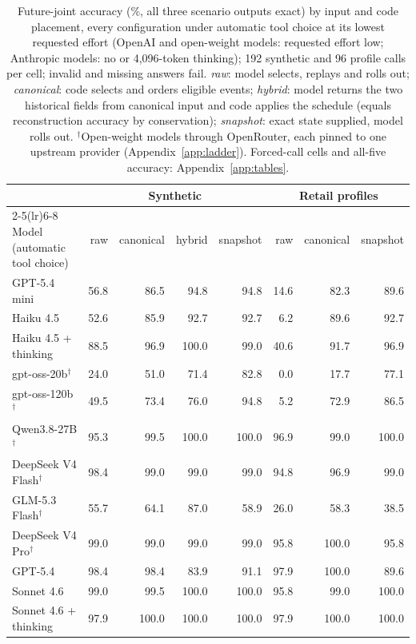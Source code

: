 \begin{table}[t]
\centering\footnotesize
\setlength{\tabcolsep}{3.5pt}
\begin{tabular}{lrrrrrrr}
\toprule
 & \multicolumn{4}{c}{Synthetic} & \multicolumn{3}{c}{Retail profiles} \\
\cmidrule(lr){2-5}\cmidrule(lr){6-8}
Model (automatic tool choice) & raw & canonical & hybrid & snapshot & raw & canonical & snapshot \\
\midrule
GPT-5.4 mini & 56.8 & 86.5 & 94.8 & 94.8 & 14.6 & 82.3 & 89.6 \\
Haiku 4.5 & 52.6 & 85.9 & 92.7 & 92.7 & 6.2 & 89.6 & 92.7 \\
Haiku 4.5 + thinking & 88.5 & 96.9 & 100.0 & 99.0 & 40.6 & 91.7 & 96.9 \\
gpt-oss-20b$^\dagger$ & 24.0 & 51.0 & 71.4 & 82.8 & 0.0 & 17.7 & 77.1 \\
gpt-oss-120b$^\dagger$ & 49.5 & 73.4 & 76.0 & 94.8 & 5.2 & 72.9 & 86.5 \\
Qwen3.8-27B$^\dagger$ & 95.3 & 99.5 & 100.0 & 100.0 & 96.9 & 99.0 & 100.0 \\
DeepSeek V4 Flash$^\dagger$ & 98.4 & 99.0 & 99.0 & 99.0 & 94.8 & 96.9 & 99.0 \\
GLM-5.3 Flash$^\dagger$ & 55.7 & 64.1 & 87.0 & 58.9 & 26.0 & 58.3 & 38.5 \\
DeepSeek V4 Pro$^\dagger$ & 99.0 & 99.0 & 99.0 & 99.0 & 95.8 & 100.0 & 95.8 \\
GPT-5.4 & 98.4 & 98.4 & 83.9 & 91.1 & 97.9 & 100.0 & 89.6 \\
Sonnet 4.6 & 99.0 & 99.5 & 100.0 & 100.0 & 95.8 & 99.0 & 100.0 \\
Sonnet 4.6 + thinking & 97.9 & 100.0 & 100.0 & 100.0 & 97.9 & 100.0 & 100.0 \\
\bottomrule
\end{tabular}
\caption{Future-joint accuracy (\%, all three scenario outputs exact) by input and code placement, every configuration under automatic tool choice at its lowest requested effort (OpenAI and open-weight models: requested effort low; Anthropic models: no or 4,096-token thinking); 192 synthetic and 96 profile calls per cell; invalid and missing answers fail. \emph{raw}: model selects, replays and rolls out; \emph{canonical}: code selects and orders eligible events; \emph{hybrid}: model returns the two historical fields from canonical input and code applies the schedule (equals reconstruction accuracy by conservation); \emph{snapshot}: exact state supplied, model rolls out. $^\dagger$Open-weight models through OpenRouter, each pinned to one upstream provider (Appendix~\ref{app:ladder}). Forced-call cells and all-five accuracy: Appendix~\ref{app:tables}.}
\label{tab:ladder}
\end{table}
